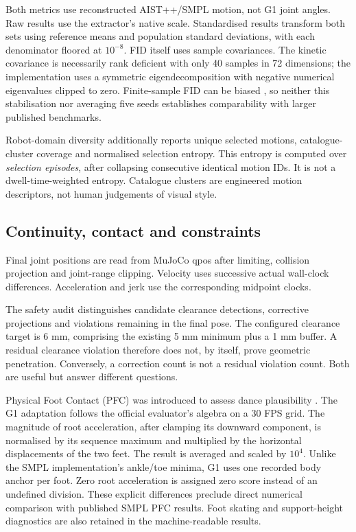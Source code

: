 Both metrics use reconstructed AIST++/SMPL motion, not G1 joint angles.
Raw results use the extractor's native scale. Standardised results transform
both sets using reference means and population standard deviations, with
each denominator floored at $10^{-8}$. FID itself uses sample covariances.
The kinetic covariance is necessarily rank deficient with only 40 samples in
72 dimensions; the implementation uses a symmetric eigendecomposition with
negative numerical eigenvalues clipped to zero. Finite-sample FID can be biased
\cite{chong2020effectively}, so neither this stabilisation nor averaging five seeds
establishes comparability with larger published benchmarks.

Robot-domain diversity additionally reports unique selected motions,
catalogue-cluster coverage and normalised selection entropy. This entropy is
computed over \emph{selection episodes}, after collapsing consecutive identical
motion IDs. It is not a dwell-time-weighted entropy. Catalogue clusters are
engineered motion descriptors, not human judgements of visual style.

\subsection{Continuity, contact and constraints}

Final joint positions are read from MuJoCo qpos after limiting, collision
projection and joint-range clipping. Velocity uses successive actual wall-clock
differences. Acceleration and jerk use the corresponding midpoint clocks.

The safety audit distinguishes candidate clearance detections, corrective
projections and violations remaining in the final pose. The configured clearance
target is 6 mm, comprising the existing 5 mm minimum plus a 1 mm buffer. A residual
clearance violation therefore does not, by itself, prove geometric penetration.
Conversely, a correction count is not a residual violation count. Both are useful
but answer different questions.

Physical Foot Contact (PFC) was introduced to assess dance plausibility
\cite{tseng2023edge}. The G1 adaptation follows the official evaluator's algebra on a
30 FPS grid. The magnitude of root acceleration, after clamping its downward
component, is normalised by its sequence maximum and multiplied by the horizontal
displacements of the two feet. The result is averaged and scaled by $10^4$.
Unlike the SMPL implementation's ankle/toe minima, G1 uses one recorded body
anchor per foot. Zero root acceleration is assigned zero score instead of an
undefined division. These explicit differences preclude direct numerical
comparison with published SMPL PFC results. Foot skating and support-height
diagnostics are also retained in the machine-readable results.

